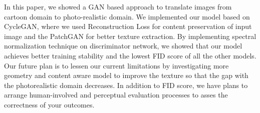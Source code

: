 \documentclass[conference]{IEEEtran}
\begin{document}
In this paper, we showed a GAN based approach to translate images from cartoon domain to photo-realistic domain. We implemented our model based on CycleGAN\cite{DBLP:conf/iccv/ZhuPIE17}, where we used Reconstruction Loss for content preservation of input image and the PatchGAN for better texture extraction. By implementing spectral normalization technique on discriminator network, we showed that our model achieves better training stability and the lowest FID score of all the other models. Our future plan is to lessen our current limitations by investigating more geometry and content aware model to improve the texture so that the gap with the photorealistic domain decreases. In addition to FID score, we have plans to arrange human-involved and perceptual evaluation processes to asses the correctness of your outcomes.



\newpage

\end{document}
